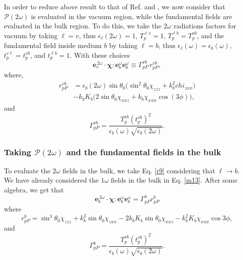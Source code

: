 \documentclass[aps,11pt]{revtex4}
\begin{document}
In order to reduce above result to that of Ref. \cite{mizrahiJOSA88} and
\cite{sipePRB87}, we now consider that $\mathcal{P}(2\omega)$ is evaluated in
the vacuum region, while the fundamental fields are evaluated in the bulk
region. To do this, we take the $2\omega$ radiations factors for vacuum by
taking $\ell=v$, thus $\epsilon_{\ell}(2\omega)=1$, $T^{\ell v}_{p}=1$, $T^{\ell
b}_{p}=T^{vb}_{p}$, and the fundamental field inside medium $b$ by taking
$\ell=b$, thus $\epsilon_{\ell}(\omega)=\epsilon_{b}(\omega)$,
$t^{v\ell}_{p}=t^{vb}_{p}$, and $t^{\ell b}_{p}=1$. With these choices
\begin{equation}\label{m800}
\mathbf{e}^{\,2\omega}_{v}\cdot\boldsymbol{\chi}:
\mathbf{e}^\omega_{b}\mathbf{e}^\omega_{b}
\equiv\Gamma^{vb}_{pP}\,r^{vb}_{pP}
,
\end{equation}
where,
\begin{equation}\label{m82}
\begin{split}
r^{vb}_{pP}
&= \epsilon_{b}(2\omega)\sin\theta_0
\Big(
\sin^2\theta_0\chi_{zzz} + k^{2}_{b}chi_{zxx}
\Big)\\
&- k_{b}K_{b}
\Big(
2\sin\theta_0\chi_{xxz} + k_{b}\chi_{xxx}\cos(3\phi) 
\Big) 
,
\end{split}
\end{equation}
and 
\begin{equation}\label{m78}
\Gamma^{vb}_{pP}
= \frac{T^{v b}_{p}(t^{vb}_{p})^2}
       {\epsilon_{b}(\omega)\sqrt{\epsilon_{b}(2\omega)}}.
\end{equation}


\subsubsection{Taking \texorpdfstring{$\mathcal{P}(2\omega)$}{P(2w)} and the
fundamental fields in the bulk}

To evaluate the $2\omega$ fields in the bulk, we
take Eq. \eqref{r9} considering that $\ell\rightarrow b$. We have already
considered the $1\omega$ fields in the bulk in Eq. \eqref{m13}. After some
algebra, we get that
\begin{equation}
\mathbf{e}^{\,2\omega}_{b}\cdot
\boldsymbol{\chi}:\mathbf{e}^{\omega}_{b}\mathbf{e}^{\omega}_{b} =
\Gamma^{b}_{pP}r^{b}_{pP}
\end{equation}
where
\begin{equation}
r^{b}_{pP} = 
  \sin^{3}\theta_0\chi_{zzz} 
+ k^{2}_{b}\sin\theta_0\chi_{zxx}
- 2k_{b}K_{b}\sin\theta_0\chi_{xxz}
- k^{2}_{b}K_{b}\chi_{xxx}\cos3\phi,
\end{equation}
and
\begin{equation}
\Gamma^{b}_{pP} =
\frac{T_{p}^{vb}\left(t^{vb}_{p}\right)^{2}}
     {\epsilon_{b}(\omega)\sqrt{\epsilon_{b}(2\omega)}}.
\end{equation}
\end{document}
